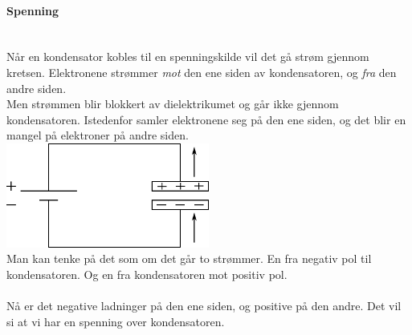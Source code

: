 \paragraph{Spenning} \mbox{} \\
Når en kondensator kobles til en spenningskilde
vil det gå strøm gjennom kretsen.
Elektronene strømmer \emph{mot} den ene siden av kondensatoren,
og \emph{fra} den andre siden.
\\
Men strømmen blir blokkert av dielektrikumet
og går ikke gjennom kondensatoren.
Istedenfor samler elektronene seg på den ene siden,
og det blir en mangel på elektroner på andre siden.
\\
\includegraphics[width=0.5\textwidth]{./img/kondensator-ladning}
\\
Man kan tenke på det som om det går to strømmer.
En fra negativ pol til kondensatoren.
Og en fra kondensatoren mot positiv pol.
\\\\
Nå er det negative ladninger på den ene siden,
og positive på den andre.
Det vil si at vi har en spenning over kondensatoren.



